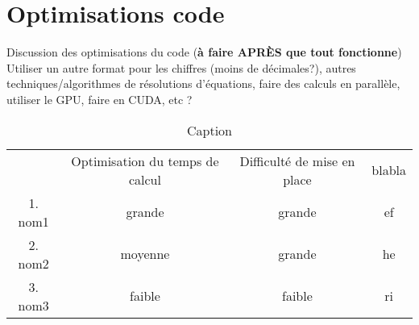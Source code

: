 \chapter{Optimisations code}
\label{chaper-5}

Discussion des optimisations du code (\textbf{à faire APRÈS que tout fonctionne})\\

Utiliser un autre format pour les chiffres (moins de décimales?), autres techniques/algorithmes de résolutions d'équations, faire des calculs en parallèle, utiliser le GPU, faire en CUDA, etc ?\\

\begin{table}[h]
    \centering
    \begin{tabular}{c|c|c|c|}
         & Optimisation du temps de calcul & Difficulté de mise en place & blabla\\
         1. nom1 & grande & grande & ef\\
         2. nom2 & moyenne & grande & he\\
         3. nom3 & faible & faible & ri\\
    \end{tabular}
    \caption{Caption}
    \label{tab:optimisation-table}
\end{table}